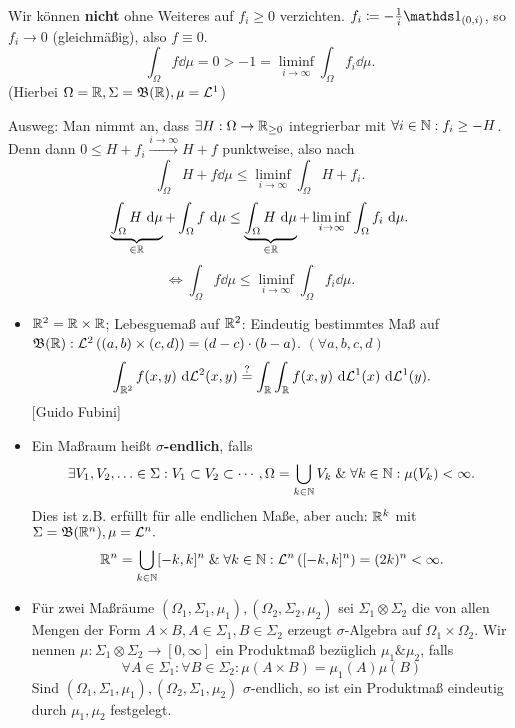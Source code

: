 \begin{note*}
	Wir können \textbf{nicht} ohne Weiteres auf $ f_i \geq 0 $ verzichten.
	$ f_i \coloneqq - \frac{ 1 }{ i } \I_{(0, i)}  $, so $ f_i \to 0 $ (gleichmäßig), also $ f \equiv 0 $.
	\[
		\int _\Omega f \dd \mu = 0 > -1 = \liminf_{i \to \infty} \int _\Omega f_i \dd \mu.
	\]
	(Hierbei $ \Omega = \mathbb{R} , \Sigma = \mathfrak{B} (\mathbb{R} ), \mu = \mathcal{L} ^1 $)

	Ausweg: Man nimmt an, dass $ \exists H : \Omega \to \mathbb{R} _{\geq 0}  $ integrierbar mit $ \forall i \in \mathbb{N} : f_i \geq - H $.
		Denn dann $ 0 \leq H + f_i \overset{i \to \infty}{\longrightarrow} H + f $ punktweise, also nach
		\[
			\int _\Omega H + f \dd \mu \leq  \liminf_{i \to \infty} \int _\Omega H + f_i.
		\]
		\[
			\underbrace{\int _\Omega H ~\text{d} \mu}_{\in \mathbb{R} } + \int _\Omega f ~\text{d} \mu \leq \underbrace{\int _\Omega H ~\text{d} \mu}_{\in \mathbb{R} } + \liminf_{i \to \infty} \int _\Omega f_i ~\text{d} \mu.
		\]
		\[
			\iff \int _\Omega f \dd \mu \leq  \liminf_{i \to \infty} \int _\Omega f_i \dd \mu.
		\]
\end{note*}

\begin{itemize}
	\item $ \mathbb{R} ^2 = \mathbb{R} \times \mathbb{R}  $; Lebesguemaß auf $ \mathbb{R} ^2 $: Eindeutig bestimmtes Maß auf $ \mathfrak{B} (\mathbb{R} ): \mathcal{L} ^2 \left( \left( a, b \right) \times \left( c, d \right)  \right) = \left( d - c \right) \cdot (b - a) $. $ (\forall a, b, c, d) $
		\[
			\int_{\mathbb{R} ^2}^{} f(x, y) ~\text{d} \mathcal{L} ^2 (x, y) \overset{?}{=} \int_{\mathbb{R} }^{} \int _{\mathbb{R}} f(x, y) ~\text{d} \mathcal{L} ^1(x) ~\text{d} \mathcal{L} ^1(y).
		\]
		{[Guido Fubini]}
	\item Ein Maßraum heißt \textbf{$ \sigma $-endlich}, falls 
		\[
			\exists V_1, V_2, \dotsc \in \Sigma : V_1 \subset V_2 \subset \dotsb, \Omega = \bigcup_{k \in \mathbb{N} } V_k \; \& \; \forall k \in \mathbb{N} : \mu (V_k) < \infty.
		\]
		Dies ist z.B. erfüllt für alle endlichen Maße, aber auch:
		$ \mathbb{R} ^k $ mit $ \Sigma = \mathfrak{B} (\mathbb{R} ^n), \mu = \mathcal{L} ^n. $ 
		\[
			\mathbb{R} ^n = \bigcup_{k \in \mathbb{N} } [-k, k]^n \; \& \; \forall k \in \mathbb{N} : \mathcal{L} ^n \left( [-k, k]^n \right) = (2k)^n < \infty.
		\]
	\item Für zwei Maßräume $ \left( \Omega_1, \Sigma_1, \mu_1 \right) , \left( \Omega_2, \Sigma_2, \mu_2 \right)  $ sei $ \Sigma_1 \otimes \Sigma_2 $ die von allen Mengen der Form $ A \times B, A \in \Sigma_1, B \in \Sigma_2 $ erzeugt $ \sigma $-Algebra auf $ \Omega_1 \times \Omega_2 $.
		Wir nennen $ \mu : \Sigma_1 \otimes \Sigma_2 \to [0, \infty] $ ein Produktmaß bezüglich $ \mu_1 \& \mu_2 $, falls
		\[
			\forall A \in \Sigma_1: \forall B \in \Sigma_2 : \mu (A \times B) = \mu_1(A) \mu(B)
		\]
		Sind $ (\Omega_1, \Sigma_1, \mu_1), \left( \Omega_2, \Sigma_1, \mu_2 \right)  $ $ \sigma $-endlich, so ist ein Produktmaß eindeutig durch $ \mu_1, \mu_2 $ festgelegt.
\end{itemize}

